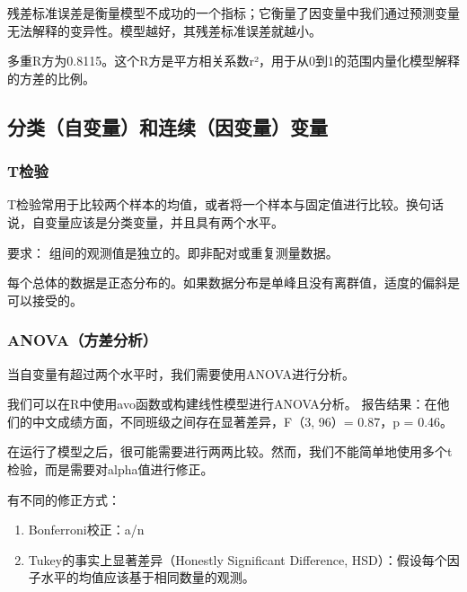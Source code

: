 \documentclass[]{book}
\providecommand{\tightlist}{%
  \setlength{\itemsep}{0pt}\setlength{\parskip}{0pt}}
\begin{document}
残差标准误差是衡量模型不成功的一个指标；它衡量了因变量中我们通过预测变量无法解释的变异性。模型越好，其残差标准误差就越小。

多重R方为0.8115。这个R方是平方相关系数r²，用于从0到1的范围内量化模型解释的方差的比例。

\hypertarget{ux5206ux7c7bux81eaux53d8ux91cfux548cux8fdeux7eedux56e0ux53d8ux91cfux53d8ux91cf}{%
\subsection{分类（自变量）和连续（因变量）变量}\label{ux5206ux7c7bux81eaux53d8ux91cfux548cux8fdeux7eedux56e0ux53d8ux91cfux53d8ux91cf}}

\hypertarget{tux68c0ux9a8c}{%
\subsubsection{T检验}\label{tux68c0ux9a8c}}

T检验常用于比较两个样本的均值，或者将一个样本与固定值进行比较。换句话说，自变量应该是分类变量，并且具有两个水平。

要求：
组间的观测值是独立的。即非配对或重复测量数据。

每个总体的数据是正态分布的。如果数据分布是单峰且没有离群值，适度的偏斜是可以接受的。

\hypertarget{anovaux65b9ux5deeux5206ux6790}{%
\subsubsection{ANOVA（方差分析）}\label{anovaux65b9ux5deeux5206ux6790}}

当自变量有超过两个水平时，我们需要使用ANOVA进行分析。

我们可以在R中使用avo函数或构建线性模型进行ANOVA分析。
报告结果：在他们的中文成绩方面，不同班级之间存在显著差异，F（3, 96）= 0.87，p = 0.46。

在运行了模型之后，很可能需要进行两两比较。然而，我们不能简单地使用多个t检验，而是需要对alpha值进行修正。

有不同的修正方式：

\begin{enumerate}
\def\labelenumi{\arabic{enumi}.}
\tightlist
\item
  Bonferroni校正：a/n
\item
  Tukey的事实上显著差异（Honestly Significant Difference, HSD）：假设每个因子水平的均值应该基于相同数量的观测。
\end{enumerate}
\end{document}
